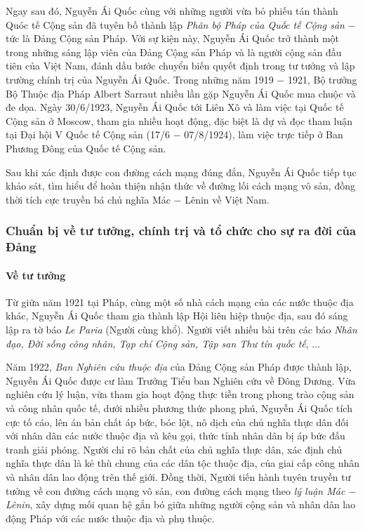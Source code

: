 Ngay sau đó, Nguyễn Ái Quốc cùng với những người vừa bỏ phiếu tán thành Quóc tế Cộng sản đã tuyên bố thành lập \textit{Phân bộ Pháp của Quốc tế Cộng sản} $-$ tức là Đảng Cộng sản Pháp. Với sự kiện này, Nguyễn Ái Quốc trở thành một trong những sáng lập viên của Đảng Cộng sản Pháp và là người cộng sản đầu tiên của Việt Nam, đánh dấu bước chuyển biến quyết định trong tư tưởng và lập trường chính trị của Nguyễn Ái Quốc. Trong những năm 1919 $-$ 1921, Bộ trưởng Bộ Thuộc địa Pháp Albert Sarraut nhiều lần gặp Nguyễn Ái Quốc mua chuộc và đe dọa. Ngày 30/6/1923, Nguyễn Ái Quốc tới Liên Xô và làm việc tại Quốc tế Cộng sản ở Moscow, tham gia nhiều hoạt động, đặc biệt là dự và đọc tham luận tại Đại hội V Quốc tế Cộng sản (17/6 $-$ 07/8/1924), làm việc trực tiếp ở Ban Phương Đông của Quốc tế Cộng sản.

Sau khi xác định được con đường cách mạng đúng đắn, Nguyễn Ái Quốc tiếp tục khảo sát, tìm hiểu để hoàn thiện nhận thức về đường lối cách mạng vô sản, đồng thời tích cực truyền bá chủ nghĩa Mác $-$ Lênin về Việt Nam.

\subsubsection{Chuẩn bị về tư tưởng, chính trị và tổ chức cho sự ra đời của Đảng}
\paragraph{Về tư tưởng}
Từ giữa năm 1921 tại Pháp, cùng một số nhà cách mạng của các nước thuộc địa khác, Nguyễn Ái Quốc tham gia thành lập Hội liên hiệp thuộc địa, sau đó sáng lập ra tờ báo \textit{Le Paria} (Người cùng khổ). Người viết nhiều bài trên các báo \textit{Nhân đạo, Đời sống công nhân, Tạp chí Cộng sản, Tập san Thư tín quốc tế}, ...

Năm 1922, \textit{Ban Nghiên cứu thuộc địa} của Đảng Cộng sản Pháp được thành lập, Nguyễn Ái Quốc được cư làm Trưởng Tiểu ban Nghiên cứu về Đông Dương. Vừa nghiên cứu lý luận, vừa tham gia hoạt động thực tiễn trong phong trào cộng sản và công nhân quốc tế, dưới nhiều phương thức phong phú, Nguyễn Ái Quốc tích cực tố cáo, lên án bản chất áp bức, bóc lột, nô dịch của chủ nghĩa thực dân đối với nhân dân các nước thuộc địa và kêu gọi, thức tỉnh nhân dân bị áp bức đấu tranh giải phóng. Người chỉ rõ bản chất của chủ nghĩa thực dân, xác định chủ nghĩa thực dân là kẻ thù chung của các dân tộc thuộc địa, của giai cấp công nhân và nhân dân lao động trên thế giới. Đồng thời, Người tiến hành tuyên truyền tư tưởng về con đường cách mạng vô sản, con đường cách mạng theo \textit{lý luận Mác $-$ Lênin}, xây dựng mối quan hệ gắn bó giữa những người cộng sản và nhân dân lao động Pháp với các nước thuộc địa và phụ thuộc.

